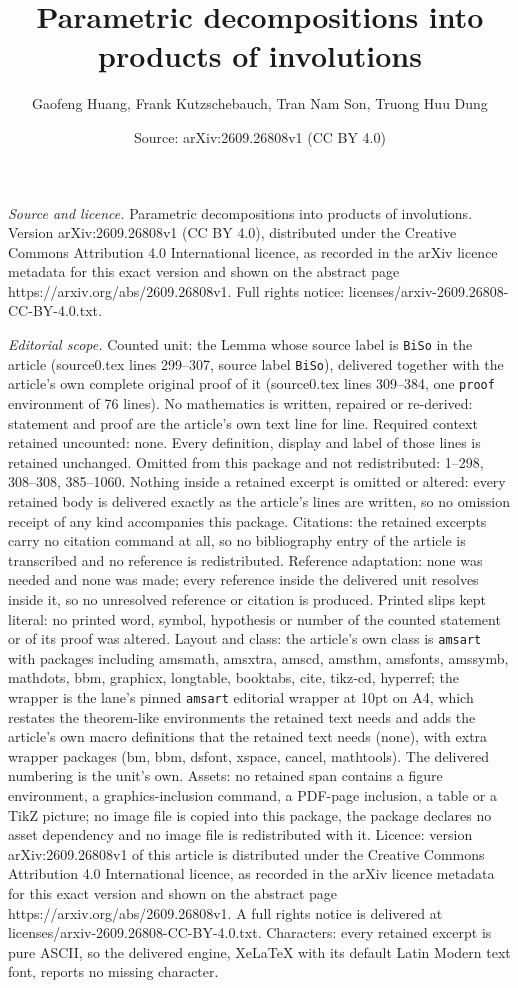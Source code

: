 \documentclass[10pt,a4paper]{amsart}
\title[Parametric decompositions into products of involutions]{Parametric decompositions into products of involutions}
\author{Gaofeng Huang, Frank Kutzschebauch, Tran Nam Son, Truong Huu Dung}
\date{Source: arXiv:2609.26808v1 (CC BY 4.0)}
\begin{document}
\maketitle

\noindent\emph{Source and licence.} Parametric decompositions into products of involutions. Version arXiv:2609.26808v1 (CC BY 4.0), distributed under the Creative Commons Attribution 4.0 International licence, as recorded in the arXiv licence metadata for this exact version and shown on the abstract page https://arxiv.org/abs/2609.26808v1. Full rights notice: licenses/arxiv-2609.26808-CC-BY-4.0.txt.\par\smallskip

\noindent\textit{Editorial scope.} Counted unit: the Lemma whose source label is \texttt{BiSo} in the article (source0.tex lines 299--307, source label \texttt{BiSo}), delivered together with the article's own complete original proof of it (source0.tex lines 309--384, one \texttt{proof} environment of 76 lines). No mathematics is written, repaired or re-derived: statement and proof are the article's own text line for line. Required context retained uncounted: none. Every definition, display and label of those lines is retained unchanged. Omitted from this package and not redistributed: 1--298, 308--308, 385--1060. Nothing inside a retained excerpt is omitted or altered: every retained body is delivered exactly as the article's lines are written, so no omission receipt of any kind accompanies this package. Citations: the retained excerpts carry no citation command at all, so no bibliography entry of the article is transcribed and no reference is redistributed. Reference adaptation: none was needed and none was made; every reference inside the delivered unit resolves inside it, so no unresolved reference or citation is produced. Printed slips kept literal: no printed word, symbol, hypothesis or number of the counted statement or of its proof was altered. Layout and class: the article's own class is \texttt{amsart} with packages including amsmath, amsxtra, amscd, amsthm, amsfonts, amssymb, mathdots, bbm, graphicx, longtable, booktabs, cite, tikz-cd, hyperref; the wrapper is the lane's pinned \texttt{amsart} editorial wrapper at 10pt on A4, which restates the theorem-like environments the retained text needs and adds the article's own macro definitions that the retained text needs (none), with extra wrapper packages (bm, bbm, dsfont, xspace, cancel, mathtools). The delivered numbering is the unit's own. Assets: no retained span contains a figure environment, a graphics-inclusion command, a PDF-page inclusion, a table or a TikZ picture; no image file is copied into this package, the package declares no asset dependency and no image file is redistributed with it. Licence: version arXiv:2609.26808v1 of this article is distributed under the Creative Commons Attribution 4.0 International licence, as recorded in the arXiv licence metadata for this exact version and shown on the abstract page https://arxiv.org/abs/2609.26808v1. A full rights notice is delivered at licenses/arxiv-2609.26808-CC-BY-4.0.txt. Characters: every retained excerpt is pure ASCII, so the delivered engine, XeLaTeX with its default Latin Modern text font, reports no missing character.
\end{document}
